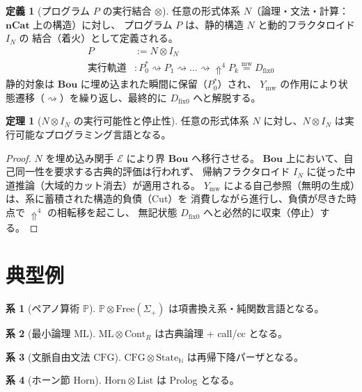 \documentclass[11pt,a4paper]{article}
\theoremstyle{definition}
\newtheorem{definition}{定義}[section]
\newtheorem{theorem}{定理}[section]
\newtheorem{corollary}{系}[section]
\newcommand{\dfix}{D_{\mathrm{fix}0}} %
\newcommand{\mweq}{\mathrel{\overset{\mathrm{mw}}{=}}}
\newcommand{\metanegation}{\Uparrow}
\newcommand{\Bou}{\mathbf{Bou}}
\newcommand{\nCat}{\mathbf{nCat}}
\newcommand{\Leadsto}{\rightsquigarrow}
\newcommand{\susp}[1]{#1^*}
\newcommand{\Ymw}{Y_{\mathrm{mw}}}
\begin{document}
\begin{definition}[プログラム $P$ の実行結合 $\otimes$]
任意の形式体系 $N$（論理・文法・計算：$\nCat$ 上の構造）に対し、
プログラム $P$ は、静的構造 $N$ と動的フラクタロイド $I_N$ の
結合（着火）として定義される。
\begin{align*}
P &:= N \otimes I_N \\
\text{実行軌道} &: \susp{P_0} \Leadsto P_1 \Leadsto \dots \Leadsto \metanegation^4 P_k \mweq \dfix
\end{align*}
静的対象は $\Bou$ に埋め込まれた瞬間に保留（$\susp{P_0}$）され、
$\Ymw$ の作用により状態遷移（$\Leadsto$）を繰り返し、最終的に $\dfix$ へと解脱する。
\end{definition}

\begin{theorem}[$N \otimes I_N$ の実行可能性と停止性]
任意の形式体系 $N$ に対し、$N \otimes I_N$ は実行可能なプログラミング言語となる。
\end{theorem}
\begin{proof}
$N$ を埋め込み関手 $\mathcal{E}$ により界 $\Bou$ へ移行させる。
$\Bou$ 上において、自己同一性を要求する古典的評価は行われず、
帰納フラクタロイド $I_N$ に従った中道推論（大域的カット消去）が適用される。
$\Ymw$ による自己参照（無明の生成）は、系に蓄積された構造的負債（Cut）を
消費しながら進行し、負債が尽きた時点で $\metanegation^4$ の相転移を起こし、
無記状態 $\dfix$ へと必然的に収束（停止）する。
\end{proof}

\section{典型例}

\begin{corollary}[ペアノ算術 $\mathbb{P}$]
$\mathbb{P} \otimes \text{Free}(\Sigma_+)$ は項書換え系・純関数言語となる。
\end{corollary}

\begin{corollary}[最小論理 $\mathrm{ML}$]
$\mathrm{ML} \otimes \text{Cont}_R$ は古典論理 + call/cc となる。
\end{corollary}

\begin{corollary}[文脈自由文法 $\mathrm{CFG}$]
$\mathrm{CFG} \otimes \text{State}_{\mathbb{N}}$ は再帰下降パーザとなる。
\end{corollary}

\begin{corollary}[ホーン節 $\mathrm{Horn}$]
$\mathrm{Horn} \otimes \text{List}$ は Prolog となる。
\end{corollary}
\end{document}
